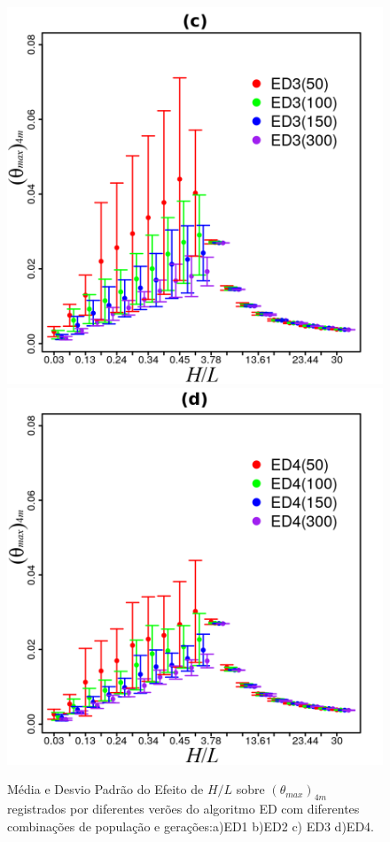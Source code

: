 \documentclass[12pt,A4,A4pt]{article}
\begin{document}
\begin{figure}[htbp]
\quad
\includegraphics[scale=.98]{imgs/plot_de3_rdata_std.png}
\quad
\includegraphics[scale=.98]{imgs/plot_de4_rdata_std.png}

\caption{\fontsize{10pt}{\baselineskip}\selectfont Média e Desvio Padrão do Efeito de $H/L$ sobre $({\theta}_{max})_{4m}$ registrados por diferentes verões do algoritmo ED com diferentes combinações de população e gerações:a)ED1 b)ED2 c) ED3 d)ED4.}
\label{destdinner}
\end{figure}
\end{document}
